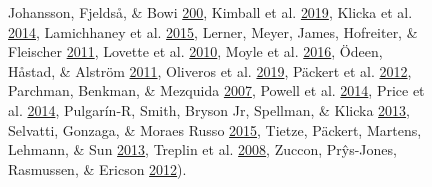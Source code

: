 \begin{figure}[!h]
{Johansson, Fjeldså, \& Bowi \protect\hyperlink{ref-johansson2008phylogenetic}{200},
Kimball et al. \protect\hyperlink{ref-kimball2019phylogenomic}{2019},
Klicka et al. \protect\hyperlink{ref-klicka2014comprehensive}{2014},
Lamichhaney et al. \protect\hyperlink{ref-lamichhaney2015evolution}{2015},
Lerner, Meyer, James, Hofreiter, \& Fleischer \protect\hyperlink{ref-lerner2011multilocus}{2011},
Lovette et al. \protect\hyperlink{ref-lovette2010comprehensive}{2010},
Moyle et al. \protect\hyperlink{ref-moyle2016tectonic}{2016},
Ödeen, Håstad, \& Alström \protect\hyperlink{ref-odeen2011evolution}{2011},
Oliveros et al. \protect\hyperlink{ref-oliveros2019earth}{2019},
Päckert et al. \protect\hyperlink{ref-packert2012horizontal}{2012},
Parchman, Benkman, \& Mezquida \protect\hyperlink{ref-parchman2007coevolution}{2007},
Powell et al. \protect\hyperlink{ref-powell2014comprehensive}{2014},
Price et al. \protect\hyperlink{ref-price2014niche}{2014},
Pulgarín-R, Smith, Bryson Jr, Spellman, \& Klicka \protect\hyperlink{ref-pulgarin2013multilocus}{2013},
Selvatti, Gonzaga, \& Moraes Russo \protect\hyperlink{ref-selvatti2015paleogene}{2015},
Tietze, Päckert, Martens, Lehmann, \& Sun \protect\hyperlink{ref-tietze2013complete}{2013},
Treplin et al. \protect\hyperlink{ref-treplin2008molecular}{2008},
Zuccon, Prŷs-Jones, Rasmussen, \& Ericson \protect\hyperlink{ref-zuccon2012phylogenetic}{2012}).
}
\label{fig:fringillidae-topologies}
\end{figure}


